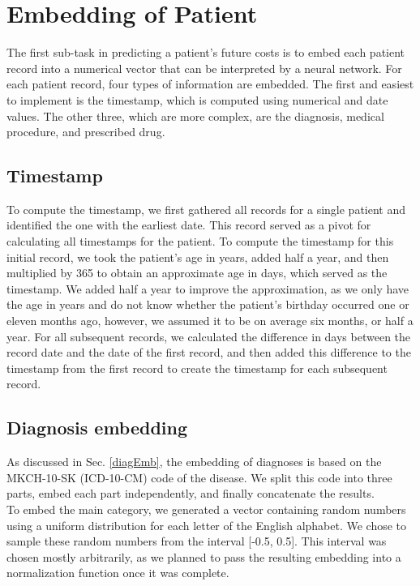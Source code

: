 
\section{Embedding of Patient}
\label{embeddingImple}

The first sub-task in predicting a patient’s future costs is to embed each patient record into a numerical vector that can be interpreted by a neural network. For each patient record, four types of information are embedded. The first and easiest to implement is the timestamp, which is computed using numerical and date values. The other three, which are more complex, are the diagnosis, medical procedure, and prescribed drug.

\subsection{Timestamp}
\label{timespampImple}

To compute the timestamp, we first gathered all records for a single patient and identified the one with the earliest date. This record served as a pivot for calculating all timestamps for the patient. To compute the timestamp for this initial record, we took the patient's age in years, added half a year, and then multiplied by 365 to obtain an approximate age in days, which served as the timestamp. We added half a year to improve the approximation, as we only have the age in years and do not know whether the patient's birthday occurred one or eleven months ago, however, we assumed it to be on average six months, or half a year. For all subsequent records, we calculated the difference in days between the record date and the date of the first record, and then added this difference to the timestamp from the first record to create the timestamp for each subsequent record.

\subsection{Diagnosis embedding}

As discussed in Sec. \ref{diagEmb}, the embedding of diagnoses is based on the MKCH-10-SK (ICD-10-CM) code of the disease. We split this code into three parts, embed each part independently, and finally concatenate the results.
\\

To embed the main category, we generated a vector containing random numbers using a uniform distribution for each letter of the English alphabet. We chose to sample these random numbers from the interval [-0.5, 0.5]. This interval was chosen mostly arbitrarily, as we planned to pass the resulting embedding into a normalization function once it was complete.
\\

